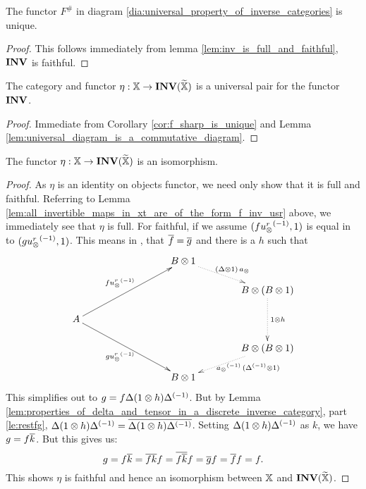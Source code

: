 \begin{corollary}\label{cor:f_sharp_is_unique}
  The functor $F^{\#}$ in diagram \vref{dia:universal_property_of_inverse_categories} is unique.
\end{corollary}
\begin{proof}
  This follows immediately from lemma \vref{lem:inv_is_full_and_faithful}, $\mathbf{INV}$ is faithful.
\end{proof}
\begin{corollary}\label{cor:eta_and_xt_are_universal_for_inv}
  The category \Xt and functor $\eta:\mathbb{X}\to \mathbf{INV}({\widetilde{\mathbb{X}}})$ is a universal pair for the functor $\mathbf{INV}$.
\end{corollary}
\begin{proof}
  Immediate from Corollary \vref{cor:f_sharp_is_unique} and Lemma \vref{lem:universal_diagram_is_a_commutative_diagram}.
\end{proof}

\begin{lemma}\label{lem:the_functor_eta_is_an_isomorphism}
  The functor $\eta:\mathbb{X} \to \mathbf{INV}({\widetilde{\mathbb{X}}})$ is an isomorphism.
\end{lemma}
\begin{proof}
  As $\eta$ is an identity on objects functor, we need only show that it is full and faithful.
  Referring to Lemma \vref{lem:all_invertible_maps_in_xt_are_of_the_form_f_inv_usr} above, we
  immediately see that $\eta$ is full. For faithful, if we assume $(f{u_{\otimes}^r}^{(-1)},1)$ is equal in \Xt
  to $(g{u_{\otimes}^r}^{(-1)},1)$. This means in \X, that $\overline{f} = \overline{g}$ and there is a $h$ such that
  \[
    \xymatrix @C=40pt @R=15pt{
      & & B \* 1 \ar@{.>}[dr]^{(\Delta\* 1) \, a_{\*}}\\
      && & B \* (B\* 1) \ar@{.>}[dd]^{1\* h} \\
      A \ar[uurr]^{f\inv{\usr}} \ar[ddrr]_{g\inv{\usr}}&&&\\
      && & B \* (B \* 1) \ar@{.>}[dl]^(.4){\ \inv{a_{\*}}\,(\inv{\Delta}\* 1)}\\
      && B\* 1
    }
  \]
  This simplifies out to $g = f \Delta (1\otimes h) {\Delta}^{(-1)}$. But by Lemma
  \vref{lem:properties_of_delta_and_tensor_in_a_discrete_inverse_category}, part \vref{le:restfg},
  $\Delta (1\otimes h) {\Delta}^{(-1)} = \overline{\Delta (1\otimes h) {\Delta}^{(-1)}}$. Setting $\Delta (1\otimes h)
  {\Delta}^{(-1)}$ as $k$, we have $g = f \overline{k}$. But this gives us:
  \[
    g = f \overline{k} = \overline{f k} f = \overline{f \overline{k}} f = \overline{g} f = \overline{f} f = f.
  \]
  This shows $\eta$ is faithful and hence an isomorphism between $\mathbb{X}$ and $\mathbf{INV}({\widetilde{\mathbb{X}}})$.
\end{proof}

